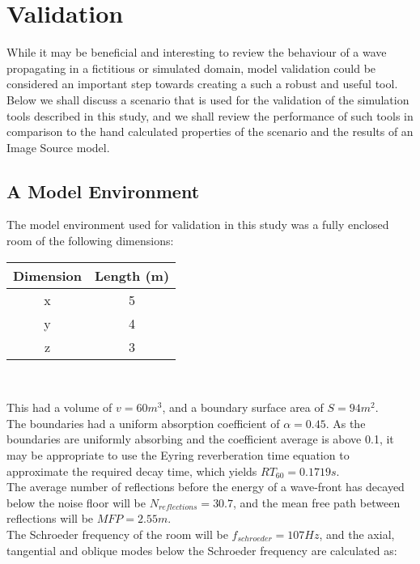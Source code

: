 %
%
%
\chapter{Validation}
\label{Introduction}
While it may be beneficial and interesting to review the behaviour of a wave propagating in a fictitious or simulated domain, model validation could be considered an important step towards creating a such a robust and useful tool. Below we shall discuss a scenario that is used for the validation of the simulation tools described in this study, and we shall review the performance of such tools in comparison to the hand calculated properties of the scenario and the results of an Image Source model.  

\section{A Model Environment}
The model environment used for validation in this study was a fully enclosed room of the following dimensions:\\

\begin{center}
\begin{tabular}{|c|c|} 
  \hline
 Dimension & Length (m) \\
 \hline
 x & 5 \\ 
 y & 4 \\  
 z & 3 \\  
 \hline
\end{tabular}\\
\end{center}

This had a volume of $ v = 60m^3$, and a boundary surface area of $S = 94m^2$.\\
The boundaries had a uniform absorption coefficient of $\alpha = 0.45 $. As the boundaries are uniformly absorbing and the coefficient average is above 0.1, it may be appropriate to use the Eyring reverberation time equation to approximate the required decay time, which yields $RT_{60} = 0.1719s $.\\
The average number of reflections before the energy of a wave-front has decayed below the noise floor will be $N_{reflections} = 30.7$, and the mean free path between reflections will be $MFP = 2.55m$.\\
The Schroeder frequency of the room will be $f_{schroeder} = 107Hz $, and the axial, tangential and oblique modes below the Schroeder frequency are calculated as:\\

